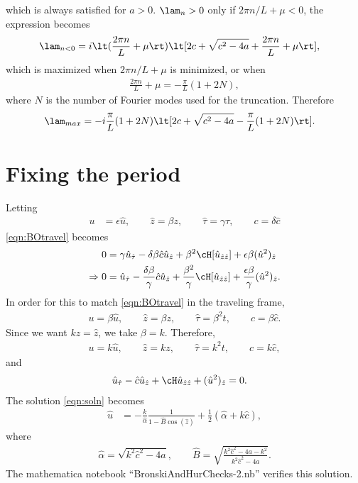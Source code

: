 \documentclass[a4paper,10pt]{article}
\begin{document}
which is always satisfied for $a>0$. $\lam_n>0$ only if $2\pi n/L+\mu<0$, the
expression becomes
\begin{align}
  \lam_{n<0} &= i \lt(\frac{2\pi n}{L}+\mu\rt)\lt[2c + \sqrt{c^2-4a} +
  \frac{2\pi n}L + \mu\rt],
\end{align}
which is maximized when $2\pi n/L+\mu$ is minimized, or when 
\begin{align}
  \frac{2\pi n}{L}+\mu = -\frac{\pi}{L}(1+2N),
\end{align}
where $N$ is the number of Fourier modes used for the truncation. Therefore
\begin{align}
  \lam_{max} &=  -i \frac{\pi}{L}(1+2N)\lt[ 2c + \sqrt{c^2-4a} - \frac\pi
  L(1+2N)\rt].
\end{align}








\section{Fixing the period}
Letting 
\begin{align}
  u &= \epsilon \hat u, \qquad \hat z = \beta z, \qquad \hat \tau = \gamma \tau, \qquad
  c = \delta \hat c
\end{align}
\eqref{eqn:BOtravel} becomes
\begin{align}
  0 &= \gamma \hat u_{\hat \tau} - \delta \beta \hat c \hat u_{\hat z}+ \beta^2
  \cH [\hat u_{\hat z \hat z}] + \epsilon \beta (\hat u^2)_{\hat z}\\
  \Rightarrow 0 &= \hat u_{\hat \tau} - \frac{\delta \beta}\gamma \hat c \hat
  u_{\hat z} + \frac{\beta^2}{\gamma} \cH [\hat u_{\hat z \hat z}] +
  \frac{\epsilon \beta}{\gamma} (\hat u^2)_{\hat z}.
\end{align}
In order for this to match \eqref{eqn:BOtravel} in the traveling frame,
\begin{align}
  u = \beta \hat u, \qquad \hat z = \beta z,\qquad  \hat \tau = \beta^2 t,\qquad  c = \beta \hat c.
\end{align}
Since we want $kz = \hat z$, we take $\beta = k$. Therefore,
\begin{align}
  u = k \hat u,\qquad  \hat z = k z, \qquad \hat \tau = k^2 t, \qquad c = k \hat c,
\end{align}
and
\begin{align}
  \hat u_{\hat \tau} - \hat c \hat u_{\hat z} + \cH \hat u_{\hat z \hat z} +
  (\hat u^2)_{\hat z} &=0.\label{eqn:BOtravelScaleFree}
\end{align}
The solution \eqref{eqn:soln} becomes
\begin{align}
  \hat u &= -\frac{k}{\hat \alpha} \frac{1}{1 - \hat B \cos(\hat z)} + \frac12(\hat
  \alpha + k \hat c),
\end{align}
where
\begin{align}
  \hat \alpha = \sqrt{ k^2 \hat c^2 - 4a}, \qquad \hat B = \sqrt{\frac{ k^2 \hat
  c^2 -4a - k^2}{k^2 \hat c^2 -4a}}.
\end{align}
The mathematica notebook ``BronskiAndHurChecks-2.nb'' verifies this solution.


{\footnotesize

}
\end{document}
